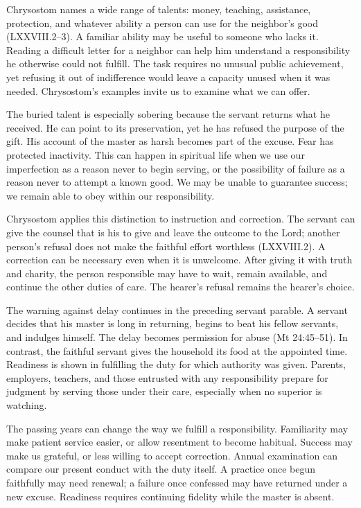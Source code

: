 Chrysostom names a wide range of talents: money, teaching, assistance, protection, and whatever ability a person can use for the neighbor's good (LXXVIII.2--3). A familiar ability may be useful to someone who lacks it. Reading a difficult letter for a neighbor can help him understand a responsibility he otherwise could not fulfill. The task requires no unusual public achievement, yet refusing it out of indifference would leave a capacity unused when it was needed. Chrysostom's examples invite us to examine what we can offer.

The buried talent is especially sobering because the servant returns what he received. He can point to its preservation, yet he has refused the purpose of the gift. His account of the master as harsh becomes part of the excuse. Fear has protected inactivity. This can happen in spiritual life when we use our imperfection as a reason never to begin serving, or the possibility of failure as a reason never to attempt a known good. We may be unable to guarantee success; we remain able to obey within our responsibility.

Chrysostom applies this distinction to instruction and correction. The servant can give the counsel that is his to give and leave the outcome to the Lord; another person's refusal does not make the faithful effort worthless (LXXVIII.2). A correction can be necessary even when it is unwelcome. After giving it with truth and charity, the person responsible may have to wait, remain available, and continue the other duties of care. The hearer's refusal remains the hearer's choice.

The warning against delay continues in the preceding servant parable. A servant decides that his master is long in returning, begins to beat his fellow servants, and indulges himself. The delay becomes permission for abuse (Mt 24:45--51). In contrast, the faithful servant gives the household its food at the appointed time. Readiness is shown in fulfilling the duty for which authority was given. Parents, employers, teachers, and those entrusted with any responsibility prepare for judgment by serving those under their care, especially when no superior is watching.

The passing years can change the way we fulfill a responsibility. Familiarity may make patient service easier, or allow resentment to become habitual. Success may make us grateful, or less willing to accept correction. Annual examination can compare our present conduct with the duty itself. A practice once begun faithfully may need renewal; a failure once confessed may have returned under a new excuse. Readiness requires continuing fidelity while the master is absent.

